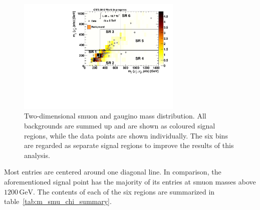 \begin{figure}[!htb]
  \centering
  \includegraphics[width=0.7\textwidth]{plots/m_smu_chi.pdf}
  \caption{Two-dimensional smuon and gaugino mass distribution. All backgrounds are summed up and are shown as coloured signal regions, while the data points are shown individually. The six bins are regarded as separate signal regions to improve the results of this analysis.}
  \label{fig:m_smu_chi}
\end{figure}

\noindent Most entries are centered around one diagonal line. In comparison, the aforementioned signal point has the majority of its entries at smuon masses above $1200\,\text{GeV}$. The contents of each of the six regions are summarized in table~\ref{tab:m_smu_chi_summary}.

